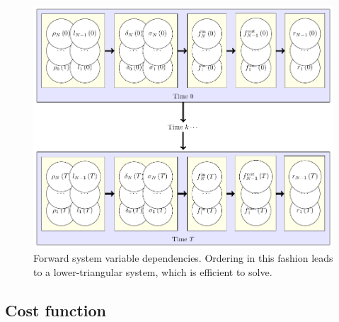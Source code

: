 \begin{figure}
\centering
\includegraphics[width=.75\columnwidth]{oldPaper/triangletikzpdf}
\caption{Forward system variable dependencies. Ordering in this fashion leads to a lower-triangular system, which is efficient to solve.}
\label{fig:variable-dependencies}
\end{figure}



\subsection{Cost function} %
\label{sub:minimzing_total_travel_time}

